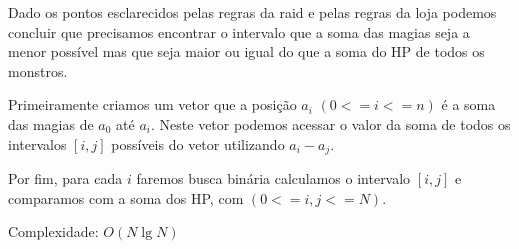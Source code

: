 Dado os pontos esclarecidos pelas regras da raid e pelas regras da loja podemos concluir que 
precisamos encontrar o intervalo que a soma das magias seja a menor possível mas que seja maior 
ou igual do que a soma do HP de todos os monstros.

Primeiramente criamos um vetor que a posição $a_i$ $(0<=i<=n)$ é a soma das magias de 
$a_0$ até $a_i$. Neste vetor podemos acessar o valor da soma de todos os intervalos $[i,j]$ 
possíveis do vetor utilizando $a_i - a_j$.

Por fim, para cada $i$ faremos busca binária calculamos o intervalo $[i,j]$ e comparamos com 
a soma dos HP, com $(0<=i,j<=N)$.

Complexidade: $O(N\lg N)$
